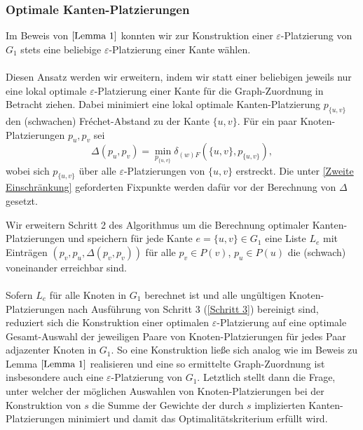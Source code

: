 \documentclass[a4paper, 12pt, twoside]{article}
\theoremstyle{Format1} %
\begin{document}
\subsubsection{Optimale Kanten-Platzierungen}
Im Beweis von $\ref{Lemma 1}$ konnten wir zur Konstruktion einer $\varepsilon$-Platzierung von $G_1$ stets eine beliebige $\varepsilon$-Platzierung einer Kante wählen.
\\
\\
Diesen Ansatz werden wir erweitern, indem wir statt einer beliebigen jeweils nur eine lokal optimale $\varepsilon$-Platzierung einer Kante für die Graph-Zuordnung in Betracht ziehen.
Dabei minimiert eine lokal optimale Kanten-Platzierung $p_{\{u,v\}}$ den (schwachen) Fréchet-Abstand zu der Kante $\{u,v\}$.
Für ein paar Knoten-Platzierungen $p_u, p_v$ sei $$\Delta(p_u,p_v) = \min_{p_{{\{u,v}\}}} \delta_{(w)F}(\{u,v\},p_{\{u,v\}}),$$ wobei sich $p_{{\{u,v}\}}$ über alle
$\varepsilon$-Platzierungen von $\{u,v\}$ erstreckt. Die unter \ref{Zweite Einschränkung} geforderten Fixpunkte werden dafür vor der Berechnung von $\Delta$ gesetzt.

Wir erweitern Schritt 2 des Algorithmus um die Berechnung optimaler Kanten-Platzierungen und speichern für jede Kante $e=\{u,v\} \in G_1$ eine Liste $L_e$
mit Einträgen $(p_v, p_u, \Delta(p_v,p_v))$ für alle $p_v \in P(v)$, $p_u \in P(u)$ die (schwach) voneinander erreichbar sind.
\\
\\
Sofern $L_e$ für alle Knoten in $G_1$ berechnet ist und alle ungültigen Knoten-Platzierungen nach Ausführung von Schritt 3 (\ref{Schritt 3}) bereinigt sind,
reduziert sich die Konstruktion einer optimalen $\varepsilon$-Platzierung auf eine optimale Gesamt-Auswahl der jeweiligen Paare von Knoten-Platzierungen für jedes Paar adjazenter Knoten in $G_1$.
So eine Konstruktion ließe sich analog wie im Beweis zu Lemma $\ref{Lemma 1}$ realisieren und eine so ermittelte Graph-Zuordnung ist insbesondere auch eine $\varepsilon$-Platzierung von $G_1$.
Letztlich stellt dann die Frage, unter welcher der möglichen Auswahlen von Knoten-Platzierungen bei der Konstruktion von $s$ die Summe der Gewichte der durch $s$ implizierten Kanten-Platzierungen
minimiert und damit das Optimalitätskriterium erfüllt wird.
\end{document}
